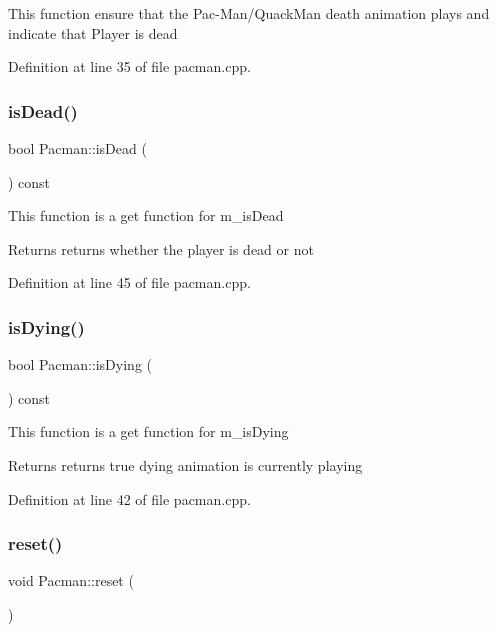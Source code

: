 This function ensure that the Pac-\/\+Man/\+Quack\+Man death animation plays and indicate that Player is dead 

Definition at line 35 of file pacman.\+cpp.

\mbox{\label{class_pacman_a5f0f0398fc20f7c06c5f05a20ad2c1ed}} 
\subsubsection{\texorpdfstring{is\+Dead()}{isDead()}}
{\footnotesize\ttfamily bool Pacman\+::is\+Dead (\begin{DoxyParamCaption}{ }\end{DoxyParamCaption}) const}

This function is a get function for m\+\_\+is\+Dead

\begin{DoxyReturn}{Returns}
returns whether the player is dead or not 
\end{DoxyReturn}


Definition at line 45 of file pacman.\+cpp.

\mbox{\label{class_pacman_afefb1eac50a96a7449ee8e910688614e}} 
\subsubsection{\texorpdfstring{is\+Dying()}{isDying()}}
{\footnotesize\ttfamily bool Pacman\+::is\+Dying (\begin{DoxyParamCaption}{ }\end{DoxyParamCaption}) const}

This function is a get function for m\+\_\+is\+Dying

\begin{DoxyReturn}{Returns}
returns true dying animation is currently playing 
\end{DoxyReturn}


Definition at line 42 of file pacman.\+cpp.

\mbox{\label{class_pacman_a6b190109b2d9400c4eb7c52913ffd0c6}} 
\subsubsection{\texorpdfstring{reset()}{reset()}}
{\footnotesize\ttfamily void Pacman\+::reset (\begin{DoxyParamCaption}{ }\end{DoxyParamCaption})}

